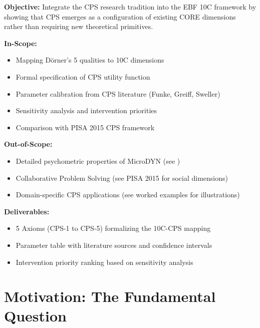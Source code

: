 \begin{tcolorbox}[colback=green!5!white, colframe=green!75!black,
    title=Appendix Scope]

\textbf{Objective:} Integrate the CPS research tradition into the EBF 10C framework by showing that CPS emerges as a configuration of existing CORE dimensions rather than requiring new theoretical primitives.

\textbf{In-Scope:}
\begin{itemize}[nosep]
\item Mapping Dörner's 5 qualities to 10C dimensions
\item Formal specification of CPS utility function
\item Parameter calibration from CPS literature (Funke, Greiff, Sweller)
\item Sensitivity analysis and intervention priorities
\item Comparison with PISA 2015 CPS framework
\end{itemize}

\textbf{Out-of-Scope:}
\begin{itemize}[nosep]
\item Detailed psychometric properties of MicroDYN (see \cite{PAP-greiff2013cps})
\item Collaborative Problem Solving (see PISA 2015 for social dimensions)
\item Domain-specific CPS applications (see worked examples for illustrations)
\end{itemize}

\textbf{Deliverables:}
\begin{itemize}[nosep]
\item 5 Axioms (CPS-1 to CPS-5) formalizing the 10C-CPS mapping
\item Parameter table with literature sources and confidence intervals
\item Intervention priority ranking based on sensitivity analysis
\end{itemize}

\end{tcolorbox}



\section{Motivation: The Fundamental Question}
\label{sec:cps-motivation}

